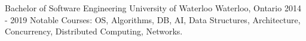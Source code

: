 


\begin{cventries}


\cventry
{Bachelor of Software Engineering} %
{University of Waterloo}
{Waterloo, Ontario} %
    {2014 - 2019} %
{ %
    Notable Courses: OS, Algorithms, DB, AI, Data Structures, Architecture, Concurrency, Distributed Computing, Networks.
}


\end{cventries}
